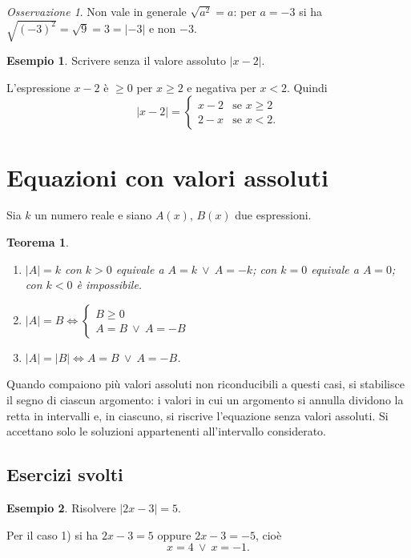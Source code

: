 \documentclass[12pt,a4paper,openany]{book}
\theoremstyle{definition}
\newtheorem{esempio}{Esempio}[section]
\theoremstyle{plain}
\newtheorem{teorema}{Teorema}[section]
\theoremstyle{remark}
\newtheorem*{osservazione}{Osservazione}
\newcommand{\abs}[1]{\left|#1\right|}
\newcommand{\sistema}[1]{\begin{cases}#1\end{cases}}
\begin{document}
\begin{osservazione}
Non vale in generale $\sqrt{a^2}=a$: per $a=-3$ si ha $\sqrt{(-3)^2}=\sqrt9=3=\abs{-3}$ e non $-3$.
\end{osservazione}

\begin{esempio}
Scrivere senza il valore assoluto $\abs{x-2}$.

L'espressione $x-2$ è $\ge 0$ per $x\ge 2$ e negativa per $x<2$. Quindi
\[
\abs{x-2}=\begin{cases} x-2 & \text{se } x\ge 2\\ 2-x & \text{se } x<2.\end{cases}
\]
\end{esempio}

\section{Equazioni con valori assoluti}

Sia $k$ un numero reale e siano $A(x)$, $B(x)$ due espressioni.

\begin{teorema}
\begin{enumerate}[label=\arabic*)]
\item $\abs{A}=k$ con $k>0$ equivale a $A=k\ \lor\ A=-k$; con $k=0$ equivale a $A=0$; con $k<0$ è impossibile.
\item $\displaystyle \abs{A}=B\iff \sistema{B\ge 0\\ A=B\ \lor\ A=-B}$
\item $\abs{A}=\abs{B}\iff A=B\ \lor\ A=-B$.
\end{enumerate}
\end{teorema}

Quando compaiono più valori assoluti non riconducibili a questi casi, si stabilisce il segno di ciascun argomento: i valori in cui un argomento si annulla dividono la retta in intervalli e, in ciascuno, si riscrive l'equazione senza valori assoluti. Si accettano solo le soluzioni appartenenti all'intervallo considerato.

\subsection*{Esercizi svolti}

\begin{esempio}
Risolvere $\abs{2x-3}=5$.

Per il caso 1) si ha $2x-3=5$ oppure $2x-3=-5$, cioè
\[
x=4\ \lor\ x=-1.
\]
\end{esempio}
\end{document}
